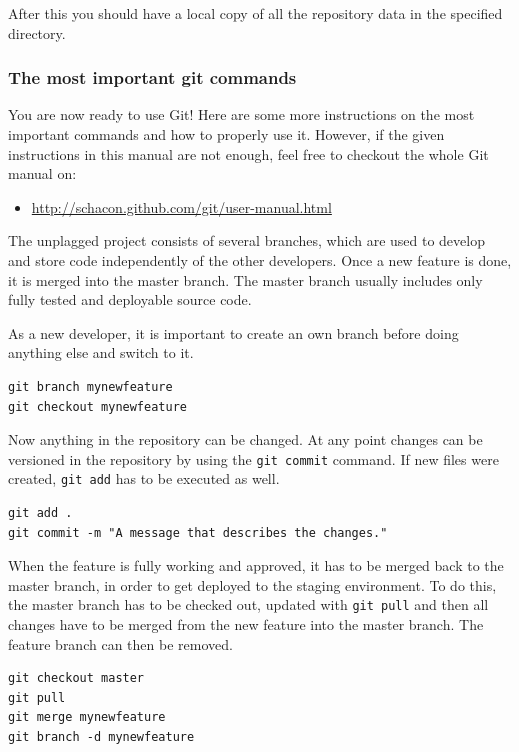 After this you should have a local copy of all the repository data in the specified directory.

\subsubsection{The most important git commands}

You are now ready to use Git! Here are some more instructions on the most important commands and how to properly 
use it. 
However, if the given instructions in this manual are not enough, feel free to checkout the whole Git manual on: 

\begin{itemize}
\item \url{http://schacon.github.com/git/user-manual.html}
\end{itemize}

The unplagged project consists of several branches, which are used to develop and store code independently of the other 
developers. Once a new feature is done, it is merged into the master branch. The master branch usually includes only 
fully tested and deployable source code. 

As a new developer, it is important to create an own branch before doing anything else and switch to it.

\begin{lstlisting}[caption=Creating branches]
git branch mynewfeature
git checkout mynewfeature
\end{lstlisting}

Now anything in the repository can be changed. At any point changes can be versioned in the repository by using the 
\texttt{git commit} 
command. If new files were created, \texttt{git add} has to be executed as well.

\begin{lstlisting}[caption=Commiting]
git add .
git commit -m "A message that describes the changes."
\end{lstlisting}

When the feature is fully working and approved, it has to be merged back to the master branch, in order to get 
deployed to the staging environment. To do this, the master branch has to be checked out, updated with \texttt{git pull} 
and then all changes have to be merged from the new feature into the master branch. The feature branch can then be
removed.

\begin{lstlisting}[caption=Merging branches]
git checkout master
git pull
git merge mynewfeature
git branch -d mynewfeature
\end{lstlisting}

